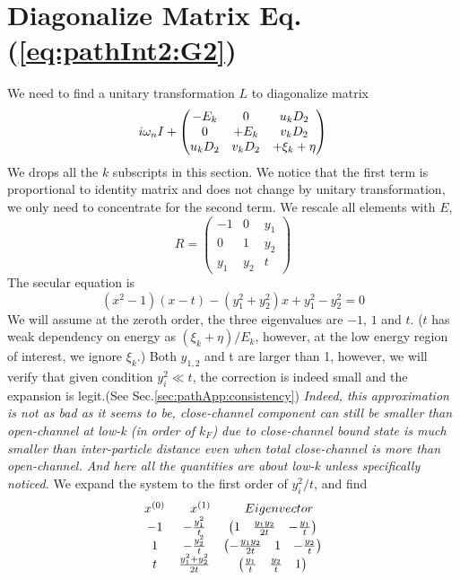 

\section{Diagonalize Matrix Eq. (\ref{eq:pathInt2:G2})\label{sec:diagonalize}}
We need to find a unitary transformation $L$ to diagonalize matrix 
\begin{equation*}
i\omega_{n}I+\begin{pmatrix}-E_k&0&u _kD_2\\0&+E_k&v_kD_2\\u_kD_2&v_kD_2&+\xi_k+\eta\end{pmatrix}
\end{equation*}
We drops all the $k$ subscripts in this section.  We notice that the first term is proportional to identity matrix and does not change by unitary transformation, we only need to concentrate for the second term.  We rescale all elements with $E$, 
\begin{equation*}
R=
\begin{pmatrix}
-1&0&y_1\\
0&1&y_2\\
y_1&y_2&t
\end{pmatrix}
\end{equation*}
The secular equation is 
\begin{equation}\label{eq:pahtApp:secular}
(x^{2}-1)(x-t)-(y_{1}^{2}+y_{2}^{2})x+y_{1}^{2}-y_{2}^{2}=0
\end{equation}
We will assume at the zeroth order, the three eigenvalues are $-1$, $1$ and $t$.  ($t$ has weak dependency on energy as $(\xi_{k}+\eta)/E_{k}$, however, at the low energy region of interest, we ignore $\xi_{k}$.) Both $y_{1,2}$ and t are larger than 1, however, we will verify that given condition $y_{i}^{2}\ll{t}$, the correction is indeed small and the expansion is legit.(See Sec.\ref{sec:pathApp:consistency})  \emph{Indeed, this approximation is not as bad as it seems to be, close-channel component can still be smaller than open-channel at low-k (in order of $k_{F}$)  due to close-channel bound state is much smaller than inter-particle distance even when total close-channel is more than open-channel.  And here all the quantities are about low-k unless specifically noticed.} 
We expand the system to the first order of $y_{i}^{2}/{t}$, and find
\begin{equation}
\begin{array}{ccc}
x^{(0)}&\quad{}x^{(1)}&\quad{}Eigenvector\nonumber\\
-1&-\frac{y_{1}^{2}}{t}&\begin{pmatrix}1&\frac{y_{1}y_{2}}{2t}&-\frac{y_{1}}{t}\end{pmatrix}\\
1&-\frac{y_{2}^{2}}{t}&\begin{pmatrix}-\frac{y_{1}y_{2}}{2t}&1&-\frac{y_{2}}{t}\end{pmatrix}\\
t&\frac{y_{1}^{2}+y_{2}^{2}}{2t}&\begin{pmatrix}\frac{y_{1}}{t}&\frac{y_{2}}{t}&1\end{pmatrix}
\end{array}
\end{equation}
